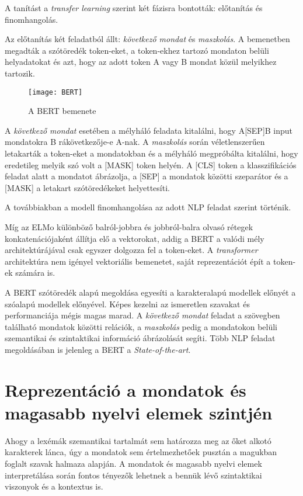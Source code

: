 A tanítást a \textit{transfer learning} szerint két fázisra bontották: előtanítás és finomhangolás. 

Az előtanítás két feladatból állt: \textit{következő mondat} és \textit{maszkolás}.
A bemenetben megadták a szótöredék token-eket, a token-ekhez tartozó mondaton belüli helyadatokat és azt, hogy az adott token A vagy B mondat közül melyikhez tartozik.

\begin{figure}[H]
	\centering
	\texttt{[image: BERT]}
	\caption{A BERT bemenete}
\end{figure}

 A \textit{következő mondat} esetében a mélyháló feladata kitalálni, hogy A[SEP]B input mondatokra B rákövetkezője-e A-nak. A \textit{maszkolás} során véletlenszerűen letakarták a token-eket a mondatokban és a mélyháló megpróbálta kitalálni, hogy eredetileg melyik szó volt a [MASK] token helyén.  A [CLS] token a klasszifikációs feladat alatt a mondatot ábrázolja, a [SEP] a mondatok közötti szeparátor és a [MASK] a letakart szótöredékeket helyettesíti.

A továbbiakban a modell finomhangolása az adott NLP feladat szerint történik.

Míg az ELMo különböző balról-jobbra és jobbról-balra olvasó rétegek konkatenációjaként állítja elő a vektorokat, addig a BERT a valódi mély architektúrájával csak egyszer dolgozza fel a token-eket. A \textit{transformer} architektúra nem igényel vektoriális bemenetet, saját reprezentációt épít a token-ek számára is.

A BERT szótöredék alapú megoldása egyesíti a karakteralapú modellek előnyét a szóalapú modellek előnyével. Képes kezelni az ismeretlen szavakat és performanciája mégis magas marad. A \textit{következő mondat} feladat a szövegben található mondatok közötti relációk, a \textit{maszkolás} pedig a mondatokon belüli szemantikai és szintaktikai információ ábrázolását segíti. Több NLP feladat megoldásában is jelenleg a BERT a \textit{State-of-the-art}.

\section{Reprezentáció a mondatok és magasabb nyelvi elemek szintjén}

Ahogy a lexémák szemantikai tartalmát sem határozza meg az őket alkotó karakterek lánca, úgy a mondatok sem értelmezhetőek pusztán a magukban foglalt szavak halmaza alapján. A mondatok és magasabb nyelvi elemek interpretálása során fontos tényezők lehetnek a bennük lévő szintaktikai viszonyok és a kontextus is.

